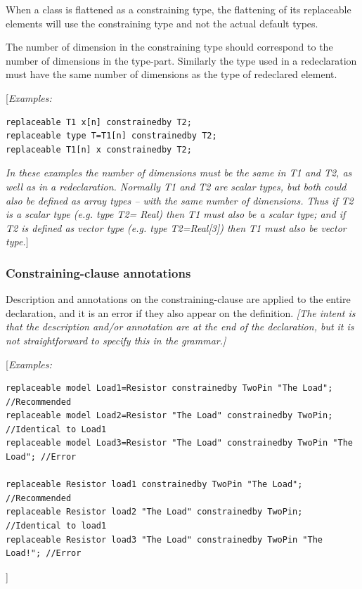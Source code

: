 \documentclass[10pt,a4paper]{report}
\def\doublelabel#1{\label{#1}}
\begin{document}
When a class is flattened as a constraining type, the flattening of its
replaceable elements will use the constraining type and not the actual
default types.

The number of dimension in the constraining type should correspond to
the number of dimensions in the type-part. Similarly the type used in a
redeclaration must have the same number of dimensions as the type of
redeclared element.

{[}\emph{Examples:}
\begin{lstlisting}[language=modelica]
replaceable T1 x[n] constrainedby T2;
replaceable type T=T1[n] constrainedby T2;
replaceable T1[n] x constrainedby T2;
\end{lstlisting}

\emph{In these examples the number of dimensions must be the same in T1
and T2, as well as in a redeclaration. Normally T1 and T2 are scalar
types, but both could also be defined as array types -- with the same
number of dimensions. Thus if T2 is a scalar type (e.g. type T2= Real)
then T1 must also be a scalar type; and if T2 is defined as vector type
  (e.g. type T2=Real[3]) then T1 must also be vector type.}]
\subsubsection{Constraining-clause annotations}\doublelabel{constraining-clause-annotations}

Description and annotations on the constraining-clause are applied to
the entire declaration, and it is an error if they also appear on the
definition. \emph{{[}The intent is that the description and/or
annotation are at the end of the declaration, but it is not
straightforward to specify this in the grammar.{]}}

{[}\emph{Examples:}
\begin{lstlisting}[language=modelica]
replaceable model Load1=Resistor constrainedby TwoPin "The Load"; //Recommended
replaceable model Load2=Resistor "The Load" constrainedby TwoPin; //Identical to Load1
replaceable model Load3=Resistor "The Load" constrainedby TwoPin "The Load"; //Error

replaceable Resistor load1 constrainedby TwoPin "The Load"; //Recommended
replaceable Resistor load2 "The Load" constrainedby TwoPin; //Identical to load1 
replaceable Resistor load3 "The Load" constrainedby TwoPin "The Load!"; //Error
\end{lstlisting}

{]}
\end{document}

